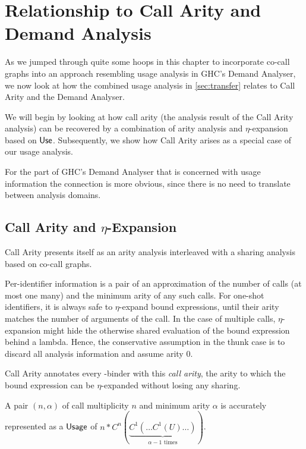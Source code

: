 \section{Relationship to Call Arity and Demand Analysis}

As we jumped through quite some hoops in this chapter to incorporate co-call graphs into an approach resembling usage analysis in GHC's Demand Analyser, we now look at how the combined usage analysis in \cref{sec:transfer} relates to Call Arity and the Demand Analyser.

We will begin by looking at how call arity (the analysis result of the Call Arity analysis) can be recovered by a combination of arity analysis and $\eta$-expansion based on $\text{\textsf{Use}}$. 
Subsequently, we show how Call Arity arises as a special case of our usage analysis.

For the part of GHC's Demand Analyser that is concerned with usage information \parencite{card} the connection is more obvious, since there is no need to translate between analysis domains.

\subsection{Call Arity and $\eta$-Expansion}

Call Arity \parencite{callarity} presents itself as an arity analysis interleaved with a sharing analysis based on co-call graphs. 

Per-identifier information is a pair of an approximation of the number of calls (\eg at most one \vs many) and the minimum arity of any such calls.
For one-shot identifiers, it is always safe to $\eta$-expand bound expressions, until their arity matches the number of arguments of the call.
In the case of multiple calls, $\eta$-expansion might hide the otherwise shared evaluation of the bound expression behind a lambda.
Hence, the conservative assumption in the thunk case is to discard all analysis information and assume arity 0.

Call Arity annotates every -binder with this \emph{call arity}, the arity to which the bound expression can be $\eta$-expanded without losing any sharing.

A pair $(n, \alpha)$ of call multiplicity $n$ and minimum arity $\alpha$ is accurately represented as a $\text{\textsf{Usage}}$ of $n*C^n(\underbrace{C^1(\ldots C^1(U) \ldots)}_{\alpha-1 \text{~times}})$.

